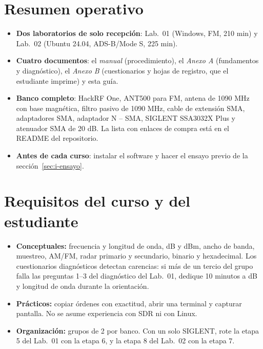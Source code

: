 
\section{Resumen operativo}

\begin{resumenejecutivo}
\begin{itemize}
  \item \textbf{Dos laboratorios de solo recepción}: Lab.\ 01 (Windows, FM, 210 min) y Lab.\ 02 (Ubuntu 24.04, ADS-B/Mode S, 225 min).
  \item \textbf{Cuatro documentos}: el \emph{manual} (procedimiento), el \emph{Anexo A} (fundamentos y diagnóstico), el \emph{Anexo B} (cuestionarios y hojas de registro, que el estudiante imprime) y esta guía.
  \item \textbf{Banco completo}: HackRF One, ANT500 para FM, antena de 1090 MHz con base magnética, filtro pasivo de 1090 MHz, cable de extensión SMA, adaptadores SMA, adaptador N -- SMA, SIGLENT SSA3032X Plus y atenuador SMA de 20 dB. La lista con enlaces de compra está en el README del repositorio.
  \item \textbf{Antes de cada curso}: instalar el software y hacer el ensayo previo de la sección~\ref{sec:i-ensayo}.
\end{itemize}
\end{resumenejecutivo}

\section{Requisitos del curso y del estudiante}

\begin{itemize}
  \item \textbf{Conceptuales:} frecuencia y longitud de onda, dB y dBm, ancho de banda, muestreo, AM/FM, radar primario y secundario, binario y hexadecimal. Los cuestionarios diagnósticos detectan carencias: si más de un tercio del grupo falla las preguntas 1--3 del diagnóstico del Lab.\ 01, dedique 10 minutos a dB y longitud de onda durante la orientación.
  \item \textbf{Prácticos:} copiar órdenes con exactitud, abrir una terminal y capturar pantalla. No se asume experiencia con SDR ni con Linux.
  \item \textbf{Organización:} grupos de 2 por banco. Con un solo SIGLENT, rote la etapa 5 del Lab.\ 01 con la etapa 6, y la etapa 8 del Lab.\ 02 con la etapa 7.
\end{itemize}

